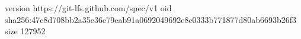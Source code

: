 version https://git-lfs.github.com/spec/v1
oid sha256:47c8d708bb2a35e36e79eab91a0692049692e8c0333b771877d80ab6693b26f3
size 127952
